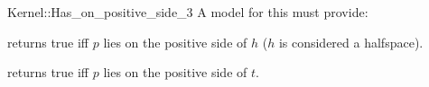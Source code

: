 \begin{ccRefFunctionObjectConcept}{Kernel::Has_on_positive_side_3}
A model for this must provide:


{returns true iff $p$ lies on the positive side of $h$ 
($h$ is considered a halfspace).}

{returns true iff $p$ lies on the positive side of $t$.}

\end{ccRefFunctionObjectConcept}
